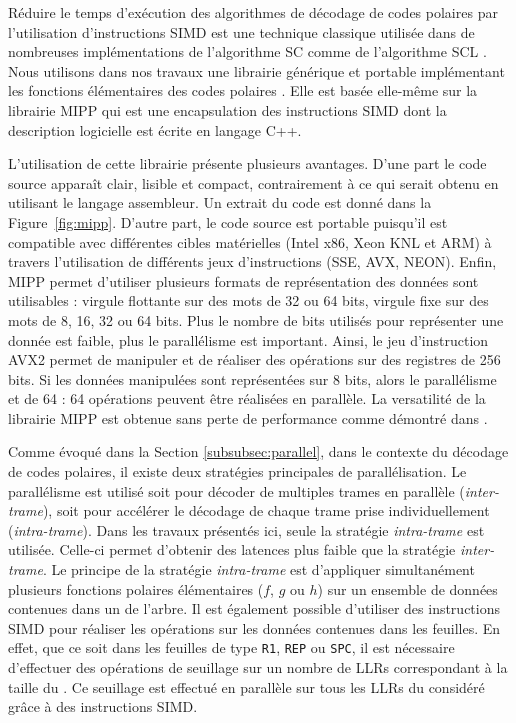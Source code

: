 Réduire le temps d'exécution des algorithmes de décodage de codes polaires par l'utilisation d'instructions SIMD est une technique classique utilisée dans de nombreuses implémentations de l'algorithme SC \cite{sarkis_fast_2014,giard_fast_2014,giard_low-latency_2016,sarkis_autogenerating_2014,gal_software_2014,cassagne_efficient_2015,cassagne_energy_2016,gal_multi-gb/s_2015} comme de l'algorithme SCL \cite{sarkis_fast_2016,sarkis_increasing_2014,shen_low-latency_2016}. Nous utilisons dans nos travaux une librairie générique et portable implémentant les fonctions élémentaires des codes polaires \cite{cassagne_efficient_2015}. Elle est basée elle-même sur la librairie MIPP \cite{cassagne2018mipp} qui est une encapsulation des instructions SIMD dont la description logicielle est écrite en langage C++.

L'utilisation de cette librairie présente plusieurs avantages. D'une part le code source apparaît clair, lisible et compact, contrairement à ce qui serait obtenu en utilisant le langage assembleur. Un extrait du code est donné dans la Figure~\ref{fig:mipp}. D'autre part, le code source est portable puisqu'il est compatible avec différentes cibles matérielles (Intel x86, Xeon KNL et ARM) à travers l'utilisation de différents jeux d'instructions (SSE, AVX, NEON). Enfin, MIPP permet d'utiliser plusieurs formats de représentation des données sont utilisables : virgule flottante sur des mots de 32 ou 64 bits, virgule fixe sur des mots de 8, 16, 32 ou 64 bits. Plus le nombre de bits utilisés pour représenter une donnée est faible, plus le parallélisme est important. Ainsi, le jeu d'instruction AVX2 permet de manipuler et de réaliser des opérations sur des registres de 256 bits. Si les données manipulées sont représentées sur 8 bits, alors le parallélisme et de 64 : 64 opérations peuvent être réalisées en parallèle. La versatilité de la librairie MIPP est obtenue sans perte de performance comme démontré dans \cite{cassagne2018mipp}.

Comme évoqué dans la Section \ref{subsubsec:parallel}, dans le contexte du décodage de codes polaires, il existe deux stratégies principales de parallélisation. Le parallélisme est utilisé soit pour décoder de multiples trames en parallèle (\textit{inter-trame}), soit pour accélérer le décodage de chaque trame prise individuellement (\textit{intra-trame}). Dans les travaux présentés ici, seule la stratégie \textit{intra-trame} est utilisée. Celle-ci permet d'obtenir des latences plus faible que la stratégie \textit{inter-trame}. Le principe de la stratégie \textit{intra-trame} est d'appliquer simultanément plusieurs fonctions polaires élémentaires ($f$, $g$ ou $h$) sur un ensemble de données contenues dans un \noeud de l'arbre. Il est également possible d'utiliser des instructions SIMD pour réaliser les opérations sur les données contenues dans les feuilles. En effet, que ce soit dans les feuilles de type \texttt{R1}, \texttt{REP} ou \texttt{SPC}, il est nécessaire d'effectuer des opérations de seuillage sur un nombre de LLRs correspondant à la taille du \noeud. Ce seuillage est effectué en parallèle sur tous les LLRs du \noeud considéré grâce à des instructions SIMD.

